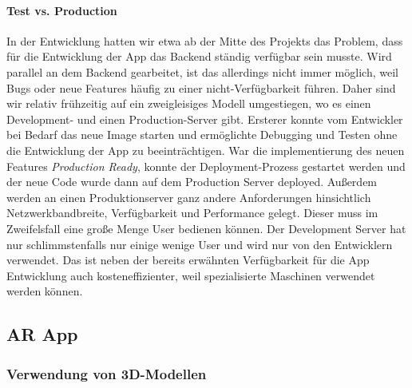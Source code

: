 \documentclass[titlepage, a4paper, 11pt]{scrartcl}
\begin{document}
        \paragraph{Test vs. Production}

          In der Entwicklung hatten wir etwa ab der Mitte des Projekts das Problem, dass für die Entwicklung der App das Backend ständig verfügbar sein musste.
          Wird parallel an dem Backend gearbeitet, ist das allerdings nicht immer möglich, weil Bugs oder neue Features häufig zu einer nicht-Verfügbarkeit führen.
          Daher sind wir relativ frühzeitig auf ein zweigleisiges Modell umgestiegen, wo es einen Development- und einen Production-Server gibt. 
          Ersterer konnte vom Entwickler bei Bedarf das neue Image starten und ermöglichte Debugging und Testen ohne die Entwicklung der App zu beeinträchtigen.
          War die implementierung des neuen Features \textit{Production Ready}, konnte der Deployment-Prozess gestartet werden und der neue Code wurde dann auf dem Production
          Server deployed. Außerdem werden an einen Produktionserver ganz andere Anforderungen hinsichtlich Netzwerkbandbreite, Verfügbarkeit und Performance gelegt.
          Dieser muss im Zweifelsfall eine große Menge User bedienen können. Der Development Server hat nur schlimmstenfalls nur einige wenige User und wird nur von den Entwicklern verwendet.
          Das ist neben der bereits erwähnten Verfügbarkeit für die App Entwicklung auch kosteneffizienter, weil spezialisierte Maschinen verwendet werden können.

    \subsection{AR App}

    \subsubsection{Verwendung von 3D-Modellen}\label{3DModels}
    
\end{document}
